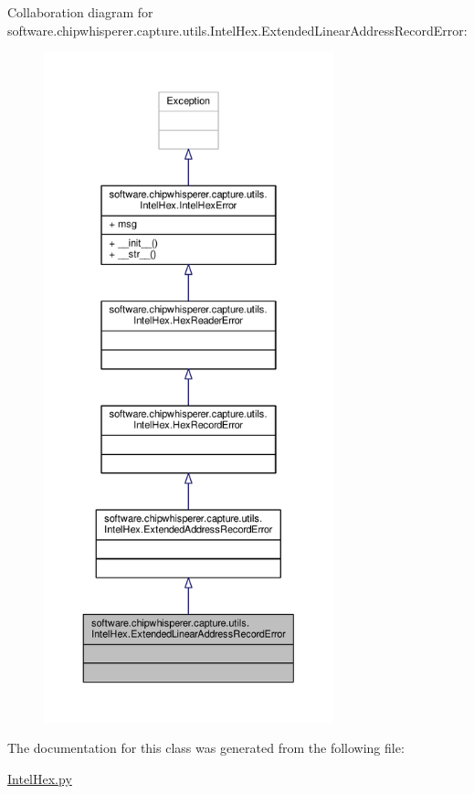 Collaboration diagram for software.\+chipwhisperer.\+capture.\+utils.\+Intel\+Hex.\+Extended\+Linear\+Address\+Record\+Error\+:\nopagebreak
\begin{figure}[H]
\begin{center}
\leavevmode
\includegraphics[height=550pt]{d5/d3f/classsoftware_1_1chipwhisperer_1_1capture_1_1utils_1_1IntelHex_1_1ExtendedLinearAddressRecordError__coll__graph}
\end{center}
\end{figure}


The documentation for this class was generated from the following file\+:\begin{DoxyCompactItemize}
\item 
\hyperlink{IntelHex_8py}{Intel\+Hex.\+py}\end{DoxyCompactItemize}
